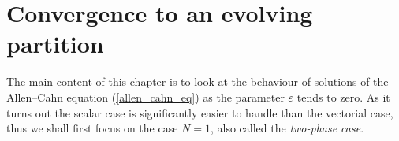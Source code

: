 \chapter{Convergence to an evolving partition}

The main content of this chapter is to look at the behaviour of solutions of the Allen--Cahn equation (\ref{allen_cahn_eq}) as the parameter $ \varepsilon $ tends to zero. As it turns out the scalar case is significantly easier to handle than the vectorial case, thus we shall first focus on the case $ N = 1 $,
also called the \emph{two-phase case}.






